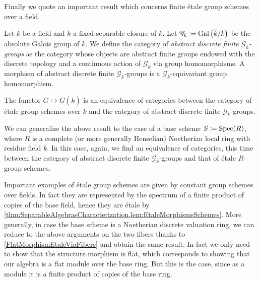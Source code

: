 \noindent
Finally we quote an important result which
concerns finite étale group schemes over a field.
\begin{defn}
	Let $k$ be a field and $\overline{k}$ a fixed separable closure of $k$.
	Let $\mathscr{G}_k \coloneqq \operatorname{Gal}\left( \overline{k} / k \right)$ be the
	absolute Galois group of $k$.
	We define the category of \emph{abstract discrete finite $\mathscr{G}_k$-groups} as the category
	whose objects are abstract finite groups endowed with the discrete topology and
	a continuous action of $\mathscr{G}_k$ via group homomorphisms.
	A morphism of abstract discrete finite $\mathscr{G}_k$-groups 
	is a $\mathscr{G}_k$-equivariant group homomorphism.
\end{defn}


\begin{thm}\label{CharacterizationEtaleGroupSchemesK}
	The functor $G \mapsto G(\overline{k})$ is an equivalence of categories
	between the category of étale group schemes over $k$ and the
	category of abstract discrete finite $\mathscr{G}_k$-groups.
\end{thm}


\begin{rem}
	We can generalize the above result to the case of a base scheme
	\(S \coloneqq \operatorname{Spec}(R)\), where \(R\) is a complete (or more generally
	Henselian) Noetherian local ring with residue field \(k\).
	In this case, again, we find an equivalence of categories,
	this time between the category of abstract discrete finite \(\mathscr{G}_k\)-groups
	and that of étale \(R\)-group schemes.
\end{rem}


\begin{ex}[]\label{EtaleConstantGroupScheme}
	Important examples of étale group schemes are given by
	constant group schemes over fields.
	In fact they are represented by the spectrum of a
	finite product of copies of the base field, hence they are étale
	by \cref{thm:SeparableAlgebrasCharacterization,lem:EtaleMorphismsSchemes}.
	More generally, in case the base scheme is a Noetherian discrete valuation
	ring, we can reduce to the above arguments on the two fibers 
	thanks to \cref{FlatMorphismEtaleViaFibers} and obtain the same result.
	In fact we only need to show that the structure morphism is flat,
	which corresponds to showing that our algebra is a flat module over the 
	base ring.
	But this is the case, since as a module it is a finite product of copies
	of the base ring.
\end{ex}



